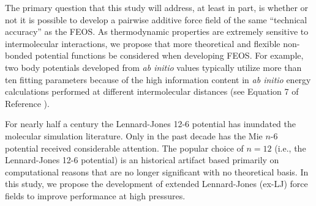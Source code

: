 \documentclass[11pt,a4paper]{article}
\begin{document}
The primary question that this study will address, at least in part, is whether or not it is possible to develop a pairwise additive force field of the same ``technical accuracy'' as the FEOS. As thermodynamic properties are extremely sensitive to  intermolecular interactions, we propose that more theoretical and flexible non-bonded potential functions be considered when developing FEOS. For example, two body potentials developed from \textit{ab initio} values typically utilize more than ten fitting parameters because of the high information content in \textit{ab initio} energy calculations performed at different intermolecular distances (see Equation 7 of Reference ).







For nearly half a century the Lennard-Jones 12-6 potential has inundated the molecular simulation literature. Only in the past decade has the Mie $n$-6 potential received considerable attention. The popular choice of $n =12$ (i.e., the Lennard-Jones 12-6 potential) is an historical artifact based primarily on computational reasons that are no longer significant with no theoretical basis. In this study, we propose the development of extended Lennard-Jones (ex-LJ) force fields to improve performance at high pressures. 
\end{document}
